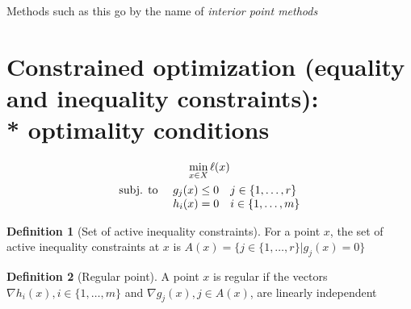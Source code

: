 \documentclass{book}
\theoremstyle{definition}
\newtheorem{definition}{Definition}[section]
\theoremstyle{remark}
\theoremstyle{remark}
\begin{document}
Methods such as this go by the name of \emph{interior point methods}

\section[Constrained optimization (equality and inequality constraints): optimality conditions]{Constrained optimization (equality and inequality constraints):\\* optimality conditions}

\begin{gather*}
    \min_{x\in X} \ell(x)\\
    \begin{array}{l l}
        \text{subj. to } & g_j(x)\leq 0 \quad j\in\{1,\dots,r\}\\
                         & h_i(x)=0 \quad i\in\{1,\dots,m\}
    \end{array}
\end{gather*}

\begin{definition}[Set of active inequality constraints]
    For a point $x$, the set of active inequality constraints at $x$ is $A(x) = \{j\in\{1,\dots,r\}|g_j(x)=0\}$
\end{definition}
\begin{definition}[Regular point]
    A point $x$ is regular if the vectors $\nabla h_i(x), i\in \{1,\dots,m\}$ and $\nabla g_j(x), j\in A(x)$, are linearly independent
\end{definition}
\end{document}
